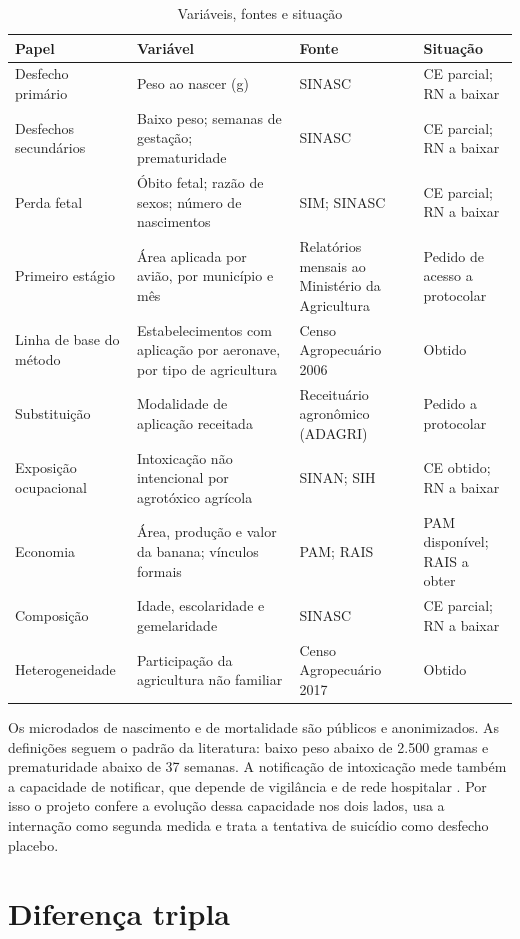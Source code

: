 \begin{table}[ht]
\centering\small
\caption{Variáveis, fontes e situação}
\label{tab:dados}
\begin{tabularx}{\textwidth}{@{}p{3.3cm}LLp{2.2cm}@{}}
\toprule
Papel & Variável & Fonte & Situação \\
\midrule
Desfecho primário & Peso ao nascer (g) & SINASC & CE parcial; RN a baixar \\
Desfechos secundários & Baixo peso; semanas de gestação; prematuridade & SINASC & CE parcial; RN a baixar \\
Perda fetal & Óbito fetal; razão de sexos; número de nascimentos & SIM; SINASC & CE parcial; RN a baixar \\
Primeiro estágio & Área aplicada por avião, por município e mês & Relatórios mensais ao Ministério da Agricultura & Pedido de acesso a protocolar \\
Linha de base do método & Estabelecimentos com aplicação por aeronave, por tipo de agricultura & Censo Agropecuário 2006 & Obtido \\
Substituição & Modalidade de aplicação receitada & Receituário agronômico (ADAGRI) & Pedido a protocolar \\
Exposição ocupacional & Intoxicação não intencional por agrotóxico agrícola & SINAN; SIH & CE obtido; RN a baixar \\
Economia & Área, produção e valor da banana; vínculos formais & PAM; RAIS & PAM disponível; RAIS a obter \\
Composição & Idade, escolaridade e gemelaridade & SINASC & CE parcial; RN a baixar \\
Heterogeneidade & Participação da agricultura não familiar & Censo Agropecuário 2017 & Obtido \\
\bottomrule
\end{tabularx}
\end{table}

Os microdados de nascimento e de mortalidade são públicos e anonimizados. As
definições seguem o padrão da literatura: baixo peso abaixo de 2.500 gramas e
prematuridade abaixo de 37 semanas. A notificação de intoxicação mede também a
capacidade de notificar, que depende de vigilância e de rede hospitalar
\cite{rodrigues2022tese}. Por isso o projeto confere a evolução dessa
capacidade nos dois lados, usa a internação como segunda medida e trata a
tentativa de suicídio como desfecho placebo.

\section{Diferença tripla}
\label{sec:ddd}

